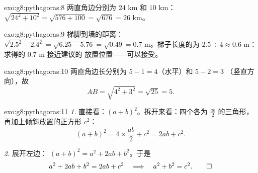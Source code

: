 \begin{solution}{exo:g8:pythagoras:8}
两直角边分别为 $24$ km 和 $10$ km：
$\sqrt{24^2 + 10^2} = \sqrt{576 + 100} = \sqrt{676} = 26$ km。
\end{solution}

\begin{solution}{exo:g8:pythagoras:9}
梯脚到墙的距离：$\sqrt{2.5^2 - 2.4^2} = \sqrt{6.25 - 5.76} =
\sqrt{0.49} = 0.7$ m。梯子长度的为
$2.5 \div 4 \approx 0.6$ m：求得的 $0.7$ m 接近建议的
放置位置——可以接受。
\end{solution}

\begin{solution}{exo:g8:pythagoras:10}
两直角边长分别为 $5 - 1 = 4$（水平）和 $5 - 2 = 3$
（竖直方向），故
\[
AB = \sqrt{4^2 + 3^2} = \sqrt{25} = 5 .
\]
\end{solution}

\begin{solution}{exo:g8:pythagoras:11}
\emph{1.} 直接看：$(a + b)^2$。拆开来看：四个各为
$\frac{ab}{2}$ 的三角形，再加上倾斜放置的正方形 $c^2$：
\[
(a + b)^2 = 4 \times \frac{ab}{2} + c^2 = 2ab + c^2 .
\]

\emph{2.} 展开左边：
$(a+b)^2 = a^2 + 2ab + b^2$。于是
\[
a^2 + 2ab + b^2 = 2ab + c^2
\quad\Longrightarrow\quad
a^2 + b^2 = c^2 . \qed
\]
\end{solution}

